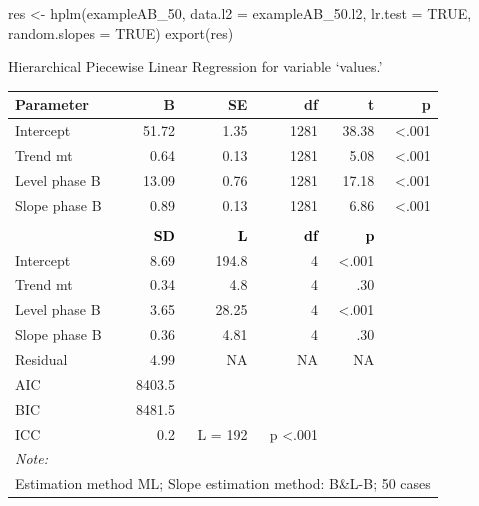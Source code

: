 \documentclass[
]{book}
\newenvironment{Shaded}{\begin{snugshade}}{\end{snugshade}}
\newcommand{\AttributeTok}[1]{\textcolor[rgb]{0.77,0.63,0.00}{#1}}
\newcommand{\ConstantTok}[1]{\textcolor[rgb]{0.00,0.00,0.00}{#1}}
\newcommand{\FunctionTok}[1]{\textcolor[rgb]{0.00,0.00,0.00}{#1}}
\newcommand{\NormalTok}[1]{#1}
\newcommand{\OtherTok}[1]{\textcolor[rgb]{0.56,0.35,0.01}{#1}}
\begin{document}
\begin{Shaded}
\begin{Highlighting}[]
\NormalTok{res }\OtherTok{\textless{}{-}} \FunctionTok{hplm}\NormalTok{(exampleAB\_50, }\AttributeTok{data.l2 =}\NormalTok{ exampleAB\_50.l2, }\AttributeTok{lr.test =} \ConstantTok{TRUE}\NormalTok{, }\AttributeTok{random.slopes =} \ConstantTok{TRUE}\NormalTok{)}
\FunctionTok{export}\NormalTok{(res)}
\end{Highlighting}
\end{Shaded}

Hierarchical Piecewise Linear Regression for variable `values.'

\begin{table}
\centering
\begin{tabular}{lrrrrr}
\toprule
Parameter & B & SE & df & t & p\\
\midrule
Intercept & 51.72 & 1.35 & 1281 & 38.38 & <.001\\
Trend mt & 0.64 & 0.13 & 1281 & 5.08 & <.001\\
Level phase B & 13.09 & 0.76 & 1281 & 17.18 & <.001\\
Slope phase B & 0.89 & 0.13 & 1281 & 6.86 & <.001\\
\midrule
\addlinespace[0.3em]
\multicolumn{6}{l}{\textbf{Random effects}}\\
\textcolor{black}{\textbf{\hspace{1em}}} & \textcolor{black}{\textbf{SD}} & \textcolor{black}{\textbf{L}} & \textcolor{black}{\textbf{df}} & \textcolor{black}{\textbf{p}} & \textcolor{black}{\textbf{}}\\
\hspace{1em}Intercept & 8.69 & 194.8 & 4 & <.001 & \\
\hspace{1em}Trend mt & 0.34 & 4.8 & 4 & .30 & \\
\hspace{1em}Level phase B & 3.65 & 28.25 & 4 & <.001 & \\
\hspace{1em}Slope phase B & 0.36 & 4.81 & 4 & .30 & \\
\hspace{1em}Residual & 4.99 & NA & NA & NA & \\
\midrule
AIC & 8403.5 &  &  &  & \\
BIC & 8481.5 &  &  &  & \\
ICC & 0.2 & L = 192 & p <.001 &  & \\
\bottomrule
\multicolumn{6}{l}{\rule{0pt}{1em}\textit{Note: }}\\
\multicolumn{6}{l}{\rule{0pt}{1em}Estimation method ML; Slope estimation method: B\&L-B; 50 cases}\\
\end{tabular}
\end{table}
\end{document}
